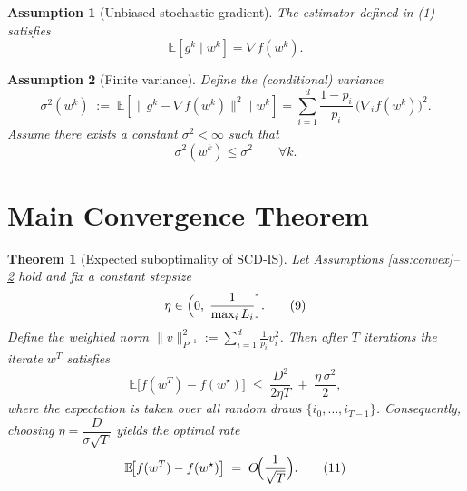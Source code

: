 \documentclass{article}
\newtheorem{theorem}{Theorem}
\newtheorem{assumption}{Assumption}
\begin{document}
\begin{assumption}[Unbiased stochastic gradient]\label{ass:unbiased}
The estimator defined in (1) satisfies
\[
\mathbb{E}\!\left[g^{k}\mid w^{k}\right]=\nabla f(w^{k}) .
\tag{6}
\]
\end{assumption}

\begin{assumption}[Finite variance]\label{ass:variance}
Define the (conditional) variance
\[
\sigma^{2}(w^{k})\;:=\;\mathbb{E}\!\left[\bigl\|g^{k}-\nabla f(w^{k})\bigr\|^{2}\mid w^{k}\right]
    =\sum_{i=1}^{d}\frac{1-p_i}{p_i}\,\bigl(\nabla_i f(w^{k})\bigr)^{2}.
\tag{7}
\]
Assume there exists a constant $\sigma^{2}<\infty$ such that
\[
\sigma^{2}(w^{k})\le\sigma^{2}\qquad\forall k .
\tag{8}
\]
\end{assumption}

\section*{Main Convergence Theorem}
\begin{theorem}[Expected suboptimality of SCD‑IS]\label{thm:main}
Let Assumptions \ref{ass:convex}--\ref{ass:variance} hold and fix a constant stepsize
\[
\eta\in\Bigl(0,\;\frac{1}{\max_{i}L_i}\Bigr].
\tag{9}
\]
Define the weighted norm $\|v\|_{P^{-1}}^{2}:=\sum_{i=1}^{d}\frac{1}{p_i}v_i^{2}$.
Then after $T$ iterations the iterate $w^{T}$ satisfies
\[
\mathbb{E}\!\bigl[f(w^{T})-f(w^{\star})\bigr]
\;\le\;
\frac{D^{2}}{2\eta T}
\;+\;
\frac{\eta\,\sigma^{2}}{2},
\tag{10}
\]
where the expectation is taken over all random draws $\{i_0,\dots,i_{T-1}\}$.
Consequently, choosing $\eta=\dfrac{D}{\sigma\sqrt{T}}$ yields the optimal rate
\[
\mathbb{E}\!\bigl[f(w^{T})-f(w^{\star})\bigr]
\;=\;O\!\Bigl(\frac{1}{\sqrt{T}}\Bigr).
\tag{11}
\]
\end{theorem}

\end{document}
